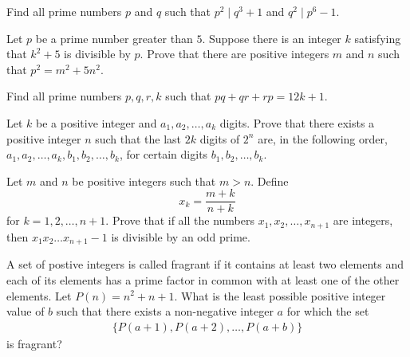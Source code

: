 \documentclass[problems.tex]{subfile}
\begin{document}
	\begin{problem}
		Find all prime numbers $p$ and $q$ such that $p^2\mid q^3+1$ and $q^2\mid p^6-1$. %
	\end{problem}

	\begin{problem}
		Let $p$ be a prime number greater than $5$. Suppose there is an integer $k$ satisfying that $k^2+5$ is divisible by $p$. Prove that there are positive integers $m$ and $n$ such that $p^2=m^2+5n^2$. %
	\end{problem}

	\begin{problem}[IberoAmerican 2016]
		Find all prime numbers $p,q,r,k$ such that $pq+qr+rp = 12k+1$. %
	\end{problem}

	\begin{problem}[IberoAmerican 2016]
		Let $k$ be a positive integer and $a_1, a_2,\dots, a_k$ digits. Prove that there exists a positive integer $n$ such that the last $2k$ digits of $2^n$ are, in the following order, $a_1, a_2,\dots, a_k , b_1, b_2, \dots, b_k$, for certain digits $b_1, b_2, \dots, b_k$. %
	\end{problem}

	\begin{problem}
		Let $m$ and $n$ be positive integers such that $m>n$. Define $$x_k=\frac{m+k}{n+k}$$ for $k=1,2,\ldots,n+1$. Prove that if all the numbers $x_1,x_2,\ldots,x_{n+1}$ are integers, then $x_1x_2\ldots x_{n+1}-1$ is divisible by an odd prime. %
	\end{problem}

	\begin{problem}[IMO 2016]
		A set of postive integers is called fragrant if it contains at least two elements and each of its elements has a prime factor in common with at least one of the other elements. Let $P(n)=n^2+n+1$. What is the least possible positive integer value of $b$ such that there exists a non-negative integer $a$ for which the set
			\begin{align*}
				\{P(a+1),P(a+2),\ldots,P(a+b)\}
			\end{align*}
		is fragrant? %
	\end{problem}
\end{document}
